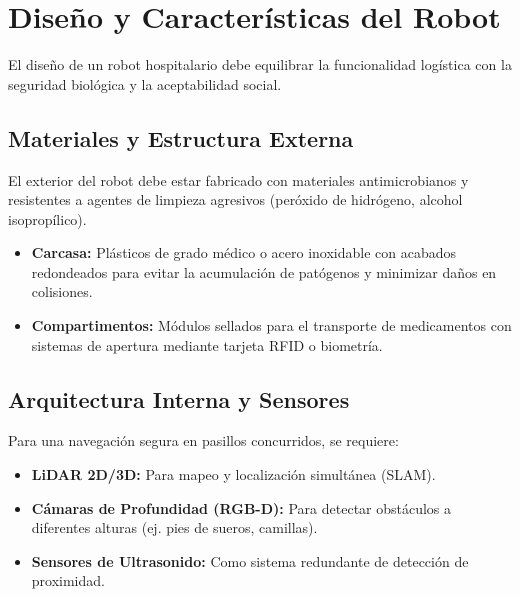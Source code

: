 \section{Diseño y Características del Robot}
El diseño de un robot hospitalario debe equilibrar la funcionalidad logística con la seguridad biológica y la aceptabilidad social.

\subsection{Materiales y Estructura Externa}
El exterior del robot debe estar fabricado con materiales antimicrobianos y resistentes a agentes de limpieza agresivos (peróxido de hidrógeno, alcohol isopropílico).
\begin{itemize}
    \item \textbf{Carcasa:} Plásticos de grado médico o acero inoxidable con acabados redondeados para evitar la acumulación de patógenos y minimizar daños en colisiones.
    \item \textbf{Compartimentos:} Módulos sellados para el transporte de medicamentos con sistemas de apertura mediante tarjeta RFID o biometría.
\end{itemize}

\subsection{Arquitectura Interna y Sensores}
Para una navegación segura en pasillos concurridos, se requiere:
\begin{itemize}
    \item \textbf{LiDAR 2D/3D:} Para mapeo y localización simultánea (SLAM).
    \item \textbf{Cámaras de Profundidad (RGB-D):} Para detectar obstáculos a diferentes alturas (ej. pies de sueros, camillas).
    \item \textbf{Sensores de Ultrasonido:} Como sistema redundante de detección de proximidad.
\end{itemize}
